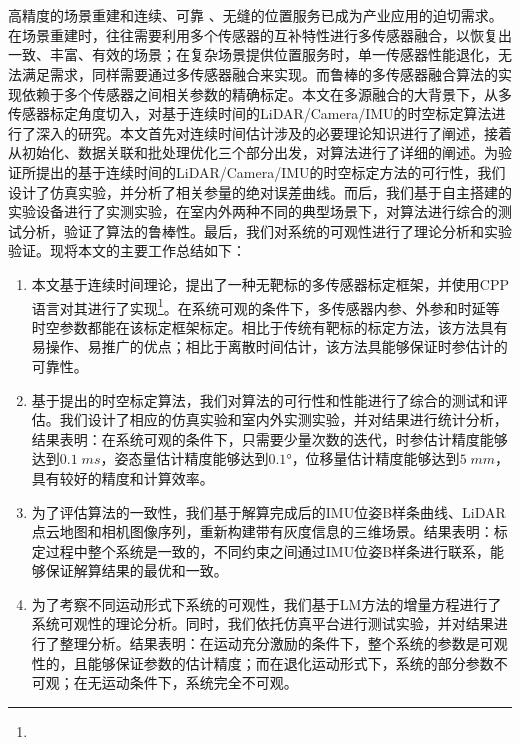 \chapter{}
\section{}
高精度的场景重建和连续、可靠 、无缝的位置服务已成为产业应用的迫切需求。在场景重建时，往往需要利用多个传感器的互补特性进行多传感器融合，以恢复出一致、丰富、有效的场景；在复杂场景提供位置服务时，单一传感器性能退化，无法满足需求，同样需要通过多传感器融合来实现。而鲁棒的多传感器融合算法的实现依赖于多个传感器之间相关参数的精确标定。本文在多源融合的大背景下，从多传感器标定角度切入，对基于连续时间的LiDAR/Camera/IMU的时空标定算法进行了深入的研究。本文首先对连续时间估计涉及的必要理论知识进行了阐述，接着从初始化、数据关联和批处理优化三个部分出发，对算法进行了详细的阐述。为验证所提出的基于连续时间的LiDAR/Camera/IMU的时空标定方法的可行性，我们设计了仿真实验，并分析了相关参量的绝对误差曲线。而后，我们基于自主搭建的实验设备进行了实测实验，在室内外两种不同的典型场景下，对算法进行综合的测试分析，验证了算法的鲁棒性。最后，我们对系统的可观性进行了理论分析和实验验证。现将本文的主要工作总结如下：
\begin{enumerate}
  \item 本文基于连续时间理论，提出了一种无靶标的多传感器标定框架，并使用CPP语言对其进行了实现\footnote{}。在系统可观的条件下，多传感器内参、外参和时延等时空参数都能在该标定框架标定。相比于传统有靶标的标定方法，该方法具有易操作、易推广的优点；相比于离散时间估计，该方法具能够保证时参估计的可靠性。

  \item 基于提出的时空标定算法，我们对算法的可行性和性能进行了综合的测试和评估。我们设计了相应的仿真实验和室内外实测实验，并对结果进行统计分析，结果表明：在系统可观的条件下，只需要少量次数的迭代，时参估计精度能够达到$0.1\;ms$，姿态量估计精度能够达到$0.1°$，位移量估计精度能够达到$5\;mm$，具有较好的精度和计算效率。

  \item 为了评估算法的一致性，我们基于解算完成后的IMU位姿B样条曲线、LiDAR点云地图和相机图像序列，重新构建带有灰度信息的三维场景。结果表明：标定过程中整个系统是一致的，不同约束之间通过IMU位姿B样条进行联系，能够保证解算结果的最优和一致。

  \item 为了考察不同运动形式下系统的可观性，我们基于LM方法的增量方程进行了系统可观性的理论分析。同时，我们依托仿真平台进行测试实验，并对结果进行了整理分析。结果表明：在运动充分激励的条件下，整个系统的参数是可观性的，且能够保证参数的估计精度；而在退化运动形式下，系统的部分参数不可观；在无运动条件下，系统完全不可观。
\end{enumerate}
